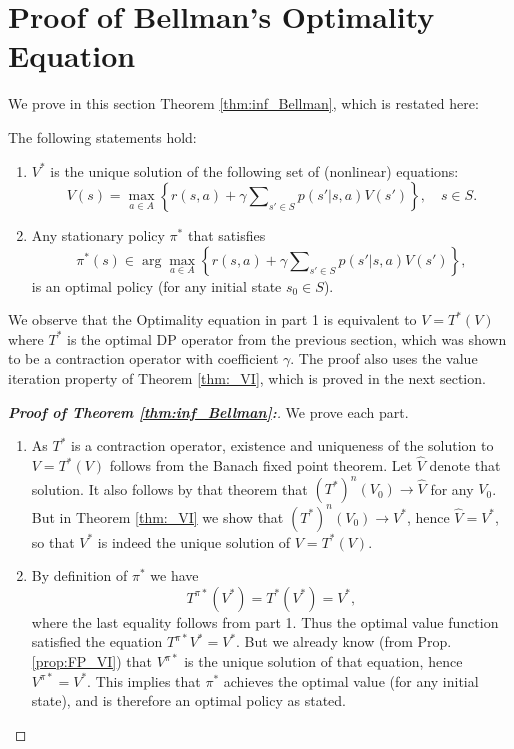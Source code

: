 \section{Proof of Bellman's Optimality Equation}
We prove in this section Theorem \ref{thm:inf_Bellman}, which is restated here:
\begin{theorem*}
The following statements hold:
\begin{enumerate}
  \item $V_{}^*$ is the unique solution of the following set of (nonlinear) equations:
\begin{equation}\label{eq:Bellman2}
V(s) = \mathop {\max }\limits_{a \in A} \left\{ {r(s,a) + \gamma \sum\nolimits_{s' \in S} {p(s'|s,a)V(s')} } \right\},     \quad s \in S.
\end{equation}
  \item Any stationary policy ${\pi ^*}$ that satisfies
\[{\pi ^*}(s) \in \arg {\max _{a \in A}}\left\{ {r(s,a) + \gamma \sum\nolimits_{s' \in S} {p(s'|s,a)V(s')} } \right\},\]
     is an optimal policy (for any initial state ${s_0} \in S$).
\end{enumerate}
\end{theorem*}
We observe that the Optimality equation in part 1 is equivalent to
$V = {T^*}(V)$
where ${T^*}$ is the optimal DP operator from the previous section, which was shown to be a contraction operator with coefficient $\gamma $.  The proof also uses the value iteration property of Theorem \ref{thm:_VI}, which is proved in the next section.

\begin{proof}[\textbf{Proof of Theorem \ref{thm:inf_Bellman}:}]
We prove each part.
\begin{enumerate}
  \item As $T_{}^*$ is a contraction operator, existence and uniqueness of the solution to $V = T_{}^*(V)$ follows from the Banach fixed point theorem. Let $\hat V$ denote that solution. It also follows by that theorem that ${(T_{}^*)^n}({V_0}) \to \hat V$ for any ${V_0}$. But in Theorem \ref{thm:_VI} we show that ${(T_{}^*)^n}({V_0}) \to V_{}^*$, hence $\hat V = V_{}^*$,  so that $V_{}^*$ is indeed the unique solution of  $V = T_{}^*(V)$.
  \item By definition of  ${\pi ^*}$ we have
\[T_{}^{\pi *}(V_{}^*) = T_{}^*(V_{}^*) = V_{}^*,\]
where the last equality follows from part 1. Thus the optimal value function satisfied the equation $T_{}^{\pi *}V_{}^* = V_{}^*$. But we already know (from Prop. \ref{prop:FP_VI}) that $V_{}^{\pi *}$ is the unique solution of that equation, hence $V_{}^{\pi *} = V_{}^*$. This implies that ${\pi ^*}$ achieves the optimal value (for any initial state), and is therefore an optimal policy as stated.
\end{enumerate}
\end{proof}

